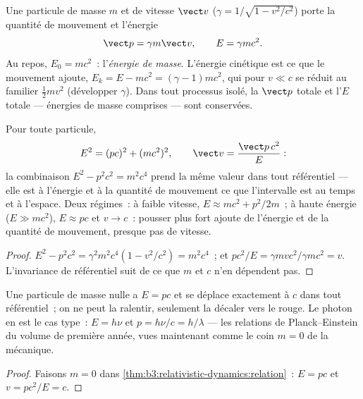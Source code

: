 \begin{definition}\label{def:b3:relativistic-dynamics:momentum-energy}
Une particule de masse $m$ et de vitesse $\vect v$ ($\gamma = 1/\sqrt{1 -
v^2/c^2}$) porte la quantité de mouvement et l'énergie
\[
\vect p = \gamma m\vect v , \qquad
E = \gamma mc^2 .
\]
Au repos, $E_0 = mc^2$~: l'\emph{énergie de masse}. L'énergie cinétique
est ce que le mouvement ajoute, $E_k = E - mc^2 = (\gamma - 1)mc^2$, qui pour $v
\ll c$ se réduit au familier $\tfrac12 mv^2$ (développer $\gamma$).
Dans tout processus isolé, la $\vect p$ totale et l'$E$ totale ---
énergies de masse comprises --- sont conservées.
\end{definition}

\begin{theorem}\label{thm:b3:relativistic-dynamics:relation}
Pour toute particule,
\[
E^2 = (pc)^2 + (mc^2)^2 ,
\qquad
\vect v = \frac{\vect p\,c^2}{E} :
\]
la combinaison $E^2 - p^2c^2 = m^2c^4$ prend la même valeur dans tout
référentiel --- elle est à l'énergie et à la quantité de mouvement ce
que l'intervalle est au temps et à l'espace. Deux régimes~: à faible
vitesse, $E \approx mc^2 + p^2/2m$~; à haute énergie ($E \gg mc^2$),
$E \approx pc$ et $v \to c$~: pousser plus fort ajoute de l'énergie et
de la quantité de mouvement, presque pas de vitesse.
\end{theorem}

\begin{proof}
$E^2 - p^2c^2 = \gamma^2m^2c^4(1 - v^2/c^2) = m^2c^4$~; et $pc^2/E =
\gamma mvc^2/\gamma mc^2 = v$. L'invariance de référentiel suit de ce
que $m$ et $c$ n'en dépendent pas.
\end{proof}

\begin{proposition}\label{prop:b3:relativistic-dynamics:massless}
Une particule de masse nulle a $E = pc$ et se déplace exactement à $c$
dans tout référentiel~; on ne peut la ralentir, seulement la décaler
vers le rouge. Le photon en est le cas type~: $E = h\nu$ et
$p = h\nu/c = h/\lambda$ --- les relations de Planck--Einstein du
volume de première année, vues maintenant comme le coin $m = 0$ de la
mécanique.
\end{proposition}

\begin{proof}
Faisons $m = 0$ dans \cref{thm:b3:relativistic-dynamics:relation}~:
$E = pc$ et $v = pc^2/E = c$.
\end{proof}

